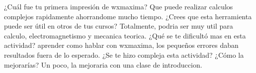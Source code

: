 \documentclass[a4paper]{article}
\begin{document}
    ¿Cuál fue tu primera impresión de wxmaxima?
    \linebreak
    Que puede realizar calculos complejos rapidamente ahorrandome mucho tiempo.
    \linebreak
    ¿Crees que esta herramienta puede ser útil en otros de tus cursos?
    \linebreak
    Totalmente, podria ser muy util para calculo, electromagnetismo y mecanica teorica.
    \linebreak
    ¿Qué se te dificultó mas en esta actividad?
    \linebreak
    aprender como hablar con wxmaxima, los pequeños errores daban resultados fuera de lo esperado.
    \linebreak
    ¿Se te hizo compleja esta actividad? ¿Cómo la mejorarías? 
    \linebreak
    Un poco, la mejoraria con una clase de introduccion. 
\end{document}
